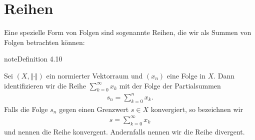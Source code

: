 \documentclass[letterpaper,10pt,english]{jupyterBook}
\begin{document}
\section{Reihen}
\label{\detokenize{metrik/reihen:reihen}}\label{\detokenize{metrik/reihen::doc}}
Eine spezielle Form von Folgen sind sogenannte Reihen, die wir als Summen von Folgen betrachten können:
\label{metrik/reihen:definition-0}
\begin{sphinxadmonition}{note}{Definition 4.10}



Sei \((X,\Vert \cdot \Vert)\) ein normierter Vektorraum und \((x_n)\) eine Folge in \(X\). Dann identifizieren wir die Reihe \(\sum_{k=0}^\infty x_k\) mit der Folge der Partialsummen
\begin{equation*}
\begin{split} s_n = \sum_{k=0}^n x_k.\end{split}
\end{equation*}
Falls die Folge \(s_n\) gegen einen Grenzwert \(s \in  X\) konvergiert, so bezeichnen wir
\begin{equation*}
\begin{split} s = \sum_{k=0}^\infty x_k\end{split}
\end{equation*}
und nennen die Reihe konvergent. Andernfalls nennen wir die Reihe divergent.
\end{sphinxadmonition}
\end{document}
